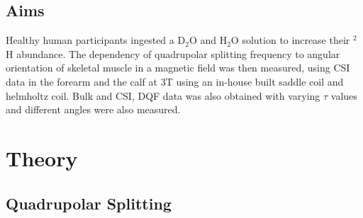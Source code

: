 \documentclass[class=article, crop=false]{standalone}
\begin{document}
\subsection{Aims}

Healthy human participants ingested a D$_2$O and H$_2$O solution to increase their $^2$H abundance. The dependency of quadrupolar splitting frequency to angular orientation of skeletal muscle in a magnetic field was then measured, using CSI data in the forearm and the calf at 3T using an in-house built saddle coil and helmholtz coil. Bulk and CSI, DQF data was also obtained with varying $\tau$ values and different angles were also measured. 

\section{Theory}
\subsection{Quadrupolar Splitting}
\end{document}
